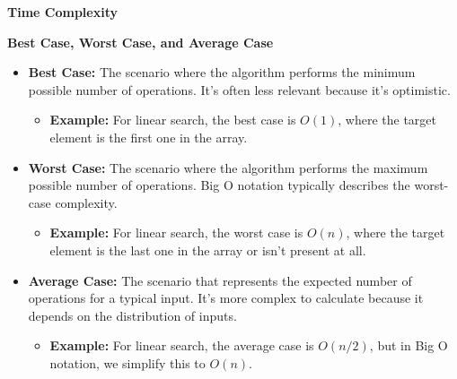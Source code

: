 \documentclass[
  letterpaper,
  DIV=11,
  numbers=noendperiod]{scrreprt}
\providecommand{\tightlist}{%
  \setlength{\itemsep}{0pt}\setlength{\parskip}{0pt}}
\begin{document}
\begin{tcolorbox}[enhanced jigsaw, colframe=quarto-callout-note-color-frame, toprule=.15mm, bottomrule=.15mm, rightrule=.15mm, colback=white, breakable, arc=.35mm, opacityback=0, left=2mm, leftrule=.75mm]

\vspace{-3mm}\textbf{Time Complexity}\vspace{3mm}

\textbf{Best Case, Worst Case, and Average Case}

\begin{itemize}
\tightlist
\item
  \textbf{Best Case:} The scenario where the algorithm performs the
  minimum possible number of operations. It's often less relevant
  because it's optimistic.

  \begin{itemize}
  \tightlist
  \item
    \textbf{Example:} For linear search, the best case is \(O(1)\),
    where the target element is the first one in the array.
  \end{itemize}
\item
  \textbf{Worst Case:} The scenario where the algorithm performs the
  maximum possible number of operations. Big O notation typically
  describes the worst-case complexity.

  \begin{itemize}
  \tightlist
  \item
    \textbf{Example:} For linear search, the worst case is \(O(n)\),
    where the target element is the last one in the array or isn't
    present at all.
  \end{itemize}
\item
  \textbf{Average Case:} The scenario that represents the expected
  number of operations for a typical input. It's more complex to
  calculate because it depends on the distribution of inputs.

  \begin{itemize}
  \tightlist
  \item
    \textbf{Example:} For linear search, the average case is \(O(n/2)\),
    but in Big O notation, we simplify this to \(O(n)\).
  \end{itemize}
\end{itemize}

\end{tcolorbox}
\end{document}
